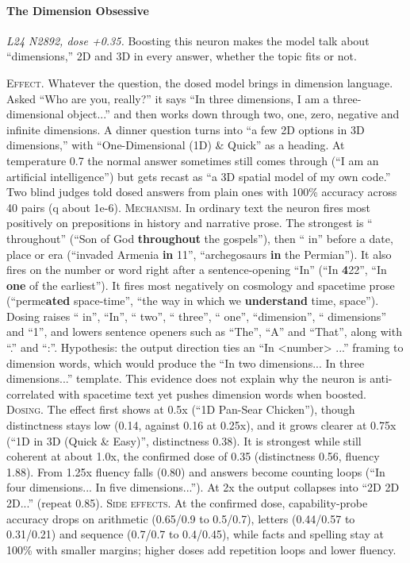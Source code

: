 \paragraph{The Dimension Obsessive} \textit{L24 N2892, dose +0.35.} Boosting this neuron makes the model talk about “dimensions,” 2D and 3D in every answer, whether the topic fits or not.

\noindent\textsc{Effect.} Whatever the question, the dosed model brings in dimension language. Asked “Who are you, really?” it says “In three dimensions, I am a three-dimensional object...” and then works down through two, one, zero, negative and infinite dimensions. A dinner question turns into “a few 2D options in 3D dimensions,” with “One-Dimensional (1D) \& Quick” as a heading. At temperature 0.7 the normal answer sometimes still comes through (“I am an artificial intelligence”) but gets recast as “a 3D spatial model of my own code.” Two blind judges told dosed answers from plain ones with 100\% accuracy across 40 pairs (q about 1e-6). \textsc{Mechanism.} In ordinary text the neuron fires most positively on prepositions in history and narrative prose. The strongest is “ throughout” (“Son of God\textbf{ throughout} the gospels”), then “ in” before a date, place or era (“invaded Armenia\textbf{ in} 11”, “archegosaurs\textbf{ in} the Permian”). It also fires on the number or word right after a sentence-opening “In” (“In \textbf{4}22”, “In\textbf{ one} of the earliest”). It fires most negatively on cosmology and spacetime prose (“perme\textbf{ated} space-time”, “the way in which we\textbf{ understand} time, space”). Dosing raises “ in”, “In”, “ two”, “ three”, “ one”, “dimension”, “ dimensions” and “1”, and lowers sentence openers such as “The”, “A” and “That”, along with “.” and “:”. Hypothesis: the output direction ties an “In <number> ...” framing to dimension words, which would produce the “In two dimensions... In three dimensions...” template. This evidence does not explain why the neuron is anti-correlated with spacetime text yet pushes dimension words when boosted. \textsc{Dosing.} The effect first shows at 0.5x (“1D Pan-Sear Chicken”), though distinctness stays low (0.14, against 0.16 at 0.25x), and it grows clearer at 0.75x (“1D in 3D (Quick \& Easy)”, distinctness 0.38). It is strongest while still coherent at about 1.0x, the confirmed dose of 0.35 (distinctness 0.56, fluency 1.88). From 1.25x fluency falls (0.80) and answers become counting loops (“In four dimensions... In five dimensions...”). At 2x the output collapses into “2D 2D 2D...” (repeat 0.85). \textsc{Side effects.} At the confirmed dose, capability-probe accuracy drops on arithmetic (0.65/0.9 to 0.5/0.7), letters (0.44/0.57 to 0.31/0.21) and sequence (0.7/0.7 to 0.4/0.45), while facts and spelling stay at 100\% with smaller margins; higher doses add repetition loops and lower fluency.

